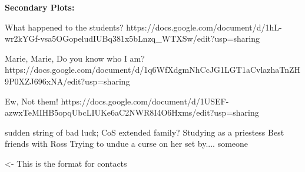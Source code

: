 \documentclass[char]{GL2020}
\begin{document}
\textbf{Secondary Plots:}

What happened to the students? https://docs.google.com/document/d/1hL-wr2kYGf-vsa5OGopeludIUBq381x5bLnzq_WTXSw/edit?usp=sharing

Marie, Marie, Do you know who I am? https://docs.google.com/document/d/1q6WfXdgmNhCcJG1LGT1aCvlazhaTnZH9P0XZJ696xNA/edit?usp=sharing

Ew, Not them! https://docs.google.com/document/d/1USEF-azwxTeMIHB5opqUbcLIUKe6aC2NWR8I4O6Hxms/edit?usp=sharing

sudden string of bad luck; CoS extended family? Studying as a priestess	Best friends with Ross	Trying to undue a curse on her set by.... someone

\begin{itemz}[Goals]
	\item 
\end{itemz}

\begin{itemz}[Notes]
	\item 
\end{itemz}

\begin{contacts}
	\contact{\cTest{}} <- This is the format for contacts 
\end{contacts}
\end{document}
